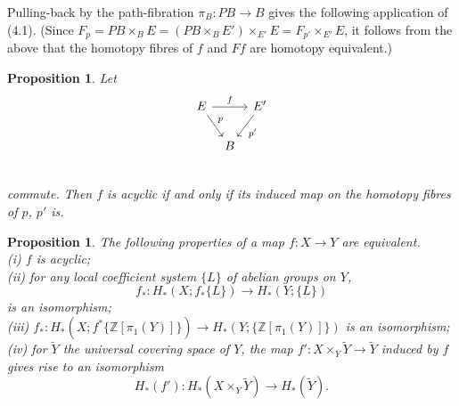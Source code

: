 \documentclass[openany,leqno]{book}  %
\newcommand{\Z}{\mathbb{Z}}
\newtheorem{prop}[theorem]{Proposition}
\begin{document}
Pulling-back by the path-fibration $\pi_B \colon   PB \longrightarrow B$ gives the following application of (4.1). (Since $F_p = PB \times_B E = (PB\times_B E') \times_{E'} E = F_{p'} \times_{E'} E$, it follows from the above that the homotopy fibres of
$f$ and $Ff$ are homotopy equivalent.) 
\begin{prop}
  Let
\[
\begin{tikzcd}[column sep=tiny]
E \arrow{rr}{f} \arrow{dr}{p} & &E' \arrow{dl}{p'} \\
& B & \\
\end{tikzcd}
\]
commute. Then $f$ is acyclic if and only if its induced map on the homotopy fibres of $p$, $p'$ is.
\end{prop}
 \begin{prop}
   The following properties of a map $f\colon   X\longrightarrow Y $ are equivalent.\\
(i) $f$ is acyclic; \\
(ii) for any local coefficient system $\{L\}$ of abelian groups on $Y$,
\[f_*\colon  H_*(X; f_*\{L\})\longrightarrow H_*(Y;\{L\})\]
is an isomorphism;\\
(iii) $f_* \colon   H_*(X; f^*\{\Z[\pi_1(Y)]\})\longrightarrow H_*(Y;\{\Z[\pi_1(Y)]\})$ is an isomorphism;\\
(iv) for $\widetilde{Y}$ the universal covering space of $Y$, the map $f' \colon   X\times_Y \widetilde{Y} \longrightarrow \widetilde{Y}$ induced by $f$ gives rise to an isomorphism
\[H_*(f')\colon   H_*(X\times_Y\widetilde{Y})\longrightarrow H_*(\widetilde{Y}).\]
 \end{prop}
\end{document}
